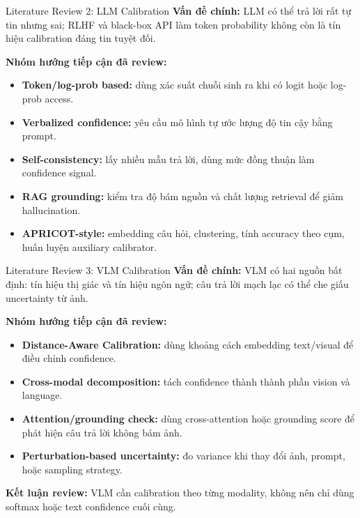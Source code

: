\documentclass[aspectratio=169]{beamer}
\begin{document}
\begin{frame}{Literature Review 2: LLM Calibration}
\textbf{Vấn đề chính:} LLM có thể trả lời rất tự tin nhưng sai; RLHF và black-box API làm token probability không còn là tín hiệu calibration đáng tin tuyệt đối.

\vspace{0.2cm}
\textbf{Nhóm hướng tiếp cận đã review:}
\begin{itemize}
\item \textbf{Token/log-prob based:} dùng xác suất chuỗi sinh ra khi có logit hoặc log-prob access.
\item \textbf{Verbalized confidence:} yêu cầu mô hình tự ước lượng độ tin cậy bằng prompt.
\item \textbf{Self-consistency:} lấy nhiều mẫu trả lời, dùng mức đồng thuận làm confidence signal.
\item \textbf{RAG grounding:} kiểm tra độ bám nguồn và chất lượng retrieval để giảm hallucination.
\item \textbf{APRICOT-style:} embedding câu hỏi, clustering, tính accuracy theo cụm, huấn luyện auxiliary calibrator.
\end{itemize}
\end{frame}

\begin{frame}{Literature Review 3: VLM Calibration}
\textbf{Vấn đề chính:} VLM có hai nguồn bất định: tín hiệu thị giác và tín hiệu ngôn ngữ; câu trả lời mạch lạc có thể che giấu uncertainty từ ảnh.

\vspace{0.2cm}
\textbf{Nhóm hướng tiếp cận đã review:}
\begin{itemize}
\item \textbf{Distance-Aware Calibration:} dùng khoảng cách embedding text/visual để điều chỉnh confidence.
\item \textbf{Cross-modal decomposition:} tách confidence thành thành phần vision và language.
\item \textbf{Attention/grounding check:} dùng cross-attention hoặc grounding score để phát hiện câu trả lời không bám ảnh.
\item \textbf{Perturbation-based uncertainty:} đo variance khi thay đổi ảnh, prompt, hoặc sampling strategy.
\end{itemize}

\vspace{0.2cm}
\textbf{Kết luận review:} VLM cần calibration theo từng modality, không nên chỉ dùng softmax hoặc text confidence cuối cùng.
\end{frame}
\end{document}
